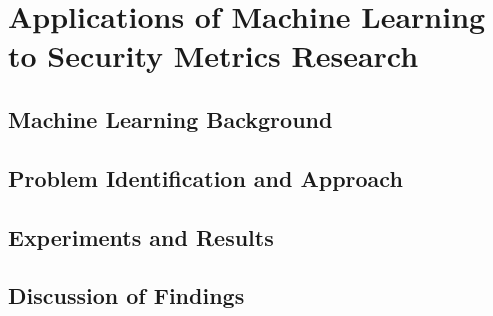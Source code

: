 

\chapter{Applications of Machine Learning to Security Metrics Research}\label{ch:ml}



\section{Machine Learning Background}\label{sec:ml:background}



\section{Problem Identification and Approach}\label{sec:ml:approach}



\section{Experiments and Results}\label{sec:ml:exp_results}



\section{Discussion of Findings}\label{sec:ml:discussion}



